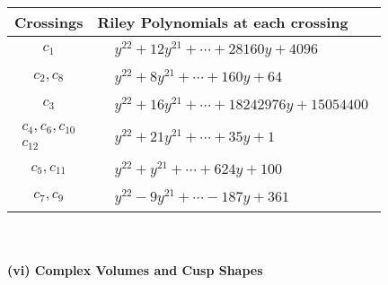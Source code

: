 \documentclass[1p]{elsarticle_modified}
\theoremstyle{definition}
\begin{document}
\begin{tabular}{m{50pt}|m{274pt}}
Crossings & \hspace{64pt}Riley Polynomials at each crossing \\
\hline $$\begin{aligned}c_{1}\end{aligned}$$&$\begin{aligned}
&y^{22}+12 y^{21}+\cdots+28160 y+4096
\end{aligned}$\\
\hline $$\begin{aligned}c_{2},c_{8}\end{aligned}$$&$\begin{aligned}
&y^{22}+8 y^{21}+\cdots+160 y+64
\end{aligned}$\\
\hline $$\begin{aligned}c_{3}\end{aligned}$$&$\begin{aligned}
&y^{22}+16 y^{21}+\cdots+18242976 y+15054400
\end{aligned}$\\
\hline $$\begin{aligned}c_{4},c_{6},c_{10}\\c_{12}\end{aligned}$$&$\begin{aligned}
&y^{22}+21 y^{21}+\cdots+35 y+1
\end{aligned}$\\
\hline $$\begin{aligned}c_{5},c_{11}\end{aligned}$$&$\begin{aligned}
&y^{22}+y^{21}+\cdots+624 y+100
\end{aligned}$\\
\hline $$\begin{aligned}c_{7},c_{9}\end{aligned}$$&$\begin{aligned}
&y^{22}-9 y^{21}+\cdots-187 y+361
\end{aligned}$\\
\hline
\end{tabular}\\~\\
\newpage\flushleft \textbf{(vi) Complex Volumes and Cusp Shapes}
\end{document}
